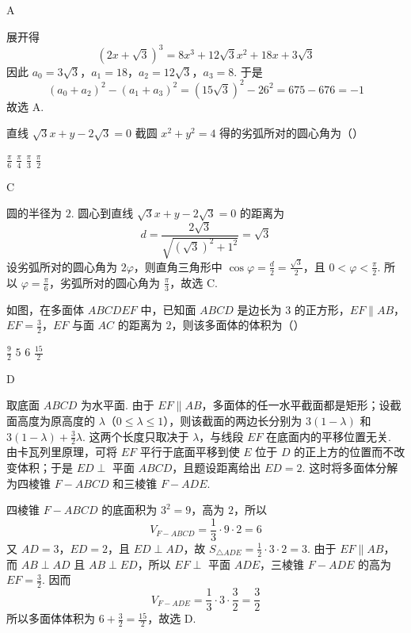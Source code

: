 \begin{answer}
A
\end{answer}

\begin{solution}
展开得
\[
(2x+\sqrt3)^3=8x^3+12\sqrt3x^2+18x+3\sqrt3
\]
因此 \(a_0=3\sqrt3\)，\(a_1=18\)，\(a_2=12\sqrt3\)，\(a_3=8\). 于是
\[
(a_0+a_2)^2-(a_1+a_3)^2=(15\sqrt3)^2-26^2=675-676=-1
\]
故选 A.
\end{solution}

\begin{problem}
直线 \(\sqrt3x+y-2\sqrt3=0\) 截圆 \(x^2+y^2=4\) 得的劣弧所对的圆心角为（\quad）

\choices
    {\(\frac{\pi}{6}\)}
    {\(\frac{\pi}{4}\)}
    {\(\frac{\pi}{3}\)}
    {\(\frac{\pi}{2}\)}
\end{problem}

\begin{answer}
C
\end{answer}

\begin{solution}
圆的半径为 \(2\). 圆心到直线
\(\sqrt3x+y-2\sqrt3=0\) 的距离为
\[
d=\frac{2\sqrt3}{\sqrt{(\sqrt3)^2+1^2}}=\sqrt3
\]
设劣弧所对的圆心角为 \(2\varphi\)，则直角三角形中
\(\cos\varphi=\frac{d}{2}=\frac{\sqrt3}{2}\)，且 \(0<\varphi<\frac{\pi}{2}\). 所以 \(\varphi=\frac{\pi}{6}\)，劣弧所对的圆心角为 \(\frac{\pi}{3}\)，故选 C.
\end{solution}

\begin{problem}
如图，在多面体 \(ABCDEF\) 中，已知面 \(ABCD\) 是边长为 \(3\) 的正方形，\(EF\parallel AB\)，\(EF=\frac{3}{2}\)，\(EF\) 与面 \(AC\) 的距离为 \(2\)，则该多面体的体积为（\quad）


\choices
    {\(\frac{9}{2}\)}
    {\(5\)}
    {\(6\)}
    {\(\frac{15}{2}\)}
\end{problem}

\begin{answer}
D
\end{answer}

\begin{solution}
取底面 \(ABCD\) 为水平面. 由于 \(EF\parallel AB\)，多面体的任一水平截面都是矩形；设截面高度为原高度的 \(\lambda\)（\(0\leq\lambda\leq1\)），则该截面的两边长分别为
\(3(1-\lambda)\) 和 \(3(1-\lambda)+\frac32\lambda\). 这两个长度只取决于 \(\lambda\)，与线段 \(EF\) 在底面内的平移位置无关. 由卡瓦列里原理，可将 \(EF\) 平行于底面平移到使 \(E\) 位于 \(D\) 的正上方的位置而不改变体积；于是 \(ED\perp\) 平面 \(ABCD\)，且题设距离给出 \(ED=2\). 这时将多面体分解为四棱锥 \(F-ABCD\) 和三棱锥 \(F-ADE\).

四棱锥 \(F-ABCD\) 的底面积为 \(3^2=9\)，高为 \(2\)，所以
\[
V_{F-ABCD}=\frac13\cdot9\cdot2=6
\]
又 \(AD=3\)，\(ED=2\)，且 \(ED\perp AD\)，故
\(S_{\triangle ADE}=\frac12\cdot3\cdot2=3\). 由于 \(EF\parallel AB\)，而 \(AB\perp AD\) 且 \(AB\perp ED\)，所以 \(EF\perp\) 平面 \(ADE\)，三棱锥 \(F-ADE\) 的高为 \(EF=\frac32\). 因而
\[
V_{F-ADE}=\frac13\cdot3\cdot\frac32=\frac32
\]
所以多面体体积为
\(6+\frac32=\frac{15}{2}\)，故选 D.
\end{solution}


